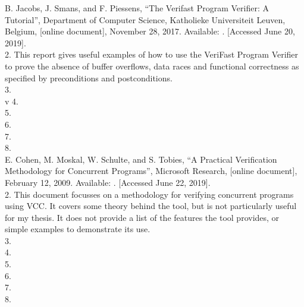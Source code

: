 \documentclass[12pt,openany,a4paper]{book}
\begin{document}
\begin{thebibliography}{99}
 B. Jacobs, J. Smans, and F. Piessens, ``The Verifast Program Verifier: A Tutorial'', Department of Computer Science, Katholieke Universiteit Leuven, Belgium, [online document], November 28, 2017. Available: \href{https://people.cs.kuleuven.be/~bart.jacobs/verifast/tutorial.pdf}{}. [Accessed June 20, 2019]. \\
2. This report gives useful examples of how to use the VeriFast Program Verifier to prove the absence of buffer overflows, data races and functional correctness as specified by preconditions and postconditions.\\
3. \\v
4. \\
5.  \\
6. \\
7. \\
8. \\

 E. Cohen, M. Moskal, W. Schulte, and S. Tobies, ``A Practical Verification Methodology for Concurrent Programs'', Microsoft Research, [online document], February 12, 2009. Available: \href{https://www.microsoft.com/en-us/research/wp-content/uploads/2016/02/concurrency3.pdf}{}. [Accessed June 22, 2019]. \\
2. This document focusses on a methodology for verifying concurrent programs using VCC. It covers some theory behind the tool, but is not particularly useful for my thesis. It does not provide a list of the features the tool provides, or simple examples to demonstrate its use.\\
3. \\
4. \\
5.  \\
6. \\
7. \\
8. \\


\end{thebibliography}
\end{document}
